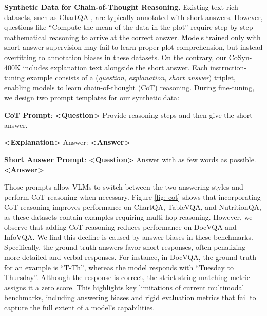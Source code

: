 \smallbreak
\noindent \textbf{Synthetic Data for Chain-of-Thought Reasoning.} Existing text-rich datasets, such as ChartQA \cite{masry-etal-2022-chartqa}, are typically annotated with short answers. 
However, questions like ``Compute the mean of the data in the plot'' require step-by-step mathematical reasoning to arrive at the correct answer. 
Models trained only with short-answer supervision may fail to learn proper plot comprehension, but instead overfitting to annotation biases in these datasets. 
On the contrary, our CoSyn-400K includes explanation text alongside the short answer. 
Each instruction-tuning example consists of a (\textit{question}, \textit{explanation}, \textit{short answer}) triplet, enabling models to learn chain-of-thought (CoT) reasoning.
During fine-tuning, we design two prompt templates for our synthetic data:
\begin{center} 
\begin{tcolorbox}[top=2pt, bottom=2pt, width=\linewidth, boxrule=1pt]
{\small {\selectfont
\textbf{CoT Prompt}: \textbf{<Question>} Provide reasoning steps and then give the short answer.

\textbf{<Explanation>}
Answer: \textbf{<Answer>}
}}
\end{tcolorbox}

\begin{tcolorbox}[top=2pt, bottom=2pt, width=\linewidth, boxrule=1pt]
{\small {\selectfont
\textbf{Short Answer Prompt}: \textbf{<Question>} Answer with as few words as possible. \textbf{<Answer>}
}}
\end{tcolorbox}
\end{center}

Those prompts allow VLMs to switch between the two answering styles and perform CoT reasoning when necessary. Figure \ref{fig: cot} shows that incorporating CoT reasoning improves performance on ChartQA, TableVQA, and NutritionQA, as these datasets contain examples requiring multi-hop reasoning.
However, we observe that adding CoT reasoning reduces performance on DocVQA and InfoVQA. 
We find this decline is caused by answer biases in these benchmarks. 
Specifically, the ground-truth answers favor short responses, often penalizing more detailed and verbal responses. 
For instance, in DocVQA, the ground-truth for an example is ``T-Th'', whereas the model responds with ``Tuesday to Thursday''. 
Although the response is correct, the strict string-matching metric assigns it a zero score.
This highlights key limitations of current multimodal benchmarks, including answering biases and rigid evaluation metrics that fail to capture the full extent of a model’s capabilities.


